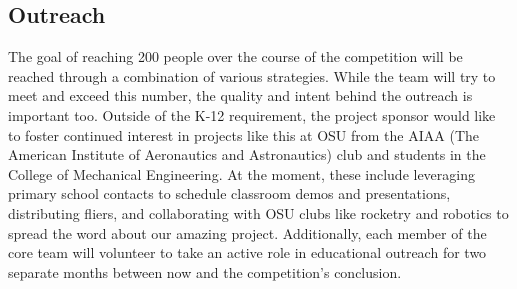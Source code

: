 \documentclass[onecolumn, draftclsnofoot,10pt, compsoc]{IEEEtran}
\begin{document}
\subsection{Outreach}
The goal of reaching 200 people over the course of the competition will be reached through a combination of various strategies. While the team will try to meet and exceed this number, the quality and intent behind the outreach is important too. Outside of the K-12 requirement, the project sponsor would like to foster continued interest in projects like this at OSU from the AIAA (The American Institute of Aeronautics and Astronautics) club and students in the College of Mechanical Engineering. At the moment, these include leveraging primary school contacts to schedule classroom demos and presentations, distributing fliers, and collaborating with OSU clubs like rocketry and robotics to spread the word about our amazing project.
Additionally, each member of the core team will volunteer to take an active role in educational outreach for two separate months between now and the competition's conclusion.
\end{document}
